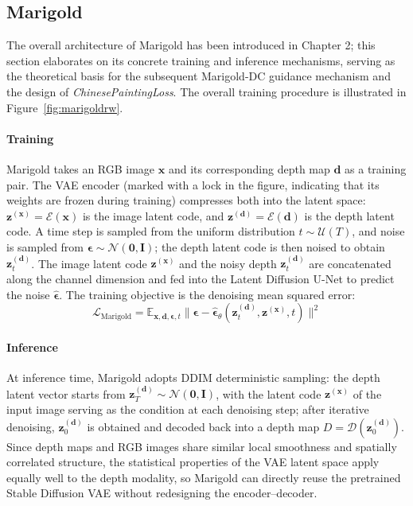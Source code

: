 \subsection{Marigold}
\label{subsec:marigold}

The overall architecture of Marigold has been introduced in Chapter 2;
this section elaborates on its concrete training and inference mechanisms,
serving as the theoretical basis for the subsequent Marigold-DC guidance mechanism and the design of \textit{ChinesePaintingLoss}.
The overall training procedure is illustrated in Figure~\ref{fig:marigoldrw}.

\paragraph{Training}
Marigold takes an RGB image $\mathbf{x}$ and its corresponding depth map $\mathbf{d}$ as a training pair.
The VAE encoder (marked with a lock in the figure, indicating that its weights are frozen during training)
compresses both into the latent space:
$\mathbf{z}^{(\mathbf{x})} = \mathcal{E}(\mathbf{x})$ is the image latent code,
and $\mathbf{z}^{(\mathbf{d})} = \mathcal{E}(\mathbf{d})$ is the depth latent code.
A time step is sampled from the uniform distribution $t \sim \mathcal{U}(T)$, and noise is sampled from $\boldsymbol{\epsilon} \sim \mathcal{N}(\mathbf{0},\mathbf{I})$;
the depth latent code is then noised to obtain $\mathbf{z}_t^{(\mathbf{d})}$.
The image latent code $\mathbf{z}^{(\mathbf{x})}$ and the noisy depth $\mathbf{z}_t^{(\mathbf{d})}$ are concatenated along the channel dimension
and fed into the Latent Diffusion U-Net to predict the noise $\hat{\boldsymbol{\epsilon}}$.
The training objective is the denoising mean squared error:
\begin{equation}
  \mathcal{L}_{\mathrm{Marigold}} =
    \mathbb{E}_{\mathbf{x},\mathbf{d},\boldsymbol{\epsilon},t}
    \bigl\|\boldsymbol{\epsilon} - \hat{\boldsymbol{\epsilon}}_\theta(\mathbf{z}_t^{(\mathbf{d})}, \mathbf{z}^{(\mathbf{x})}, t)\bigr\|^2
\end{equation}

\paragraph{Inference}
At inference time, Marigold adopts DDIM deterministic sampling:
the depth latent vector starts from $\mathbf{z}_T^{(\mathbf{d})} \sim \mathcal{N}(\mathbf{0},\mathbf{I})$,
with the latent code $\mathbf{z}^{(\mathbf{x})}$ of the input image serving as the condition at each denoising step;
after iterative denoising, $\mathbf{z}_0^{(\mathbf{d})}$ is obtained
and decoded back into a depth map $D = \mathcal{D}(\mathbf{z}_0^{(\mathbf{d})})$.
Since depth maps and RGB images share similar local smoothness and spatially correlated structure,
the statistical properties of the VAE latent space apply equally well to the depth modality,
so Marigold can directly reuse the pretrained Stable Diffusion VAE without redesigning the encoder--decoder.

